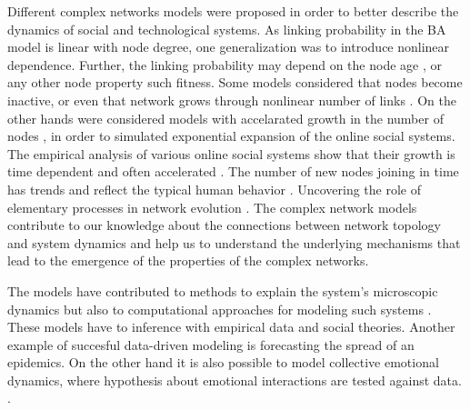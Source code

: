 Different complex networks models were proposed in order to better describe the dynamics of social and technological systems. As linking probability in the BA model is linear with node degree, one generalization was to introduce nonlinear dependence. Further, the linking probability may depend on the node age \cite{dorogovtsev2000b, dorogovtsev2001b}, or any other node property such fitness. Some models considered that nodes become inactive, or even that network grows through nonlinear number of links \cite{pham2016}. On the other hands were considered models with accelarated growth in the number of nodes \cite{sen2004}, in order to simulated exponential expansion of the online social systems. The empirical analysis of various online social systems show that their growth is time dependent and often accelerated \cite{liu2019}. The number of new nodes joining in time has trends and reflect the typical human behavior \cite{mitrovic2010a, mitrovic2012,mitrovic2015}. Uncovering the role of elementary processes in network evolution \cite{ghoshal2013uncovering}. The complex network models contribute to our knowledge about the connections between network topology and system dynamics and help us to understand the underlying mechanisms that lead to the emergence of the properties of the complex networks. %



The models have contributed to methods to explain the system's microscopic dynamics but also to computational approaches for modeling such systems \cite{schweitzer2018sociophysics}. These models have to inference with empirical data and social theories. Another example of succesful data-driven modeling is forecasting the spread of an epidemics. On the other hand it is also possible to model collective emotional dynamics, where hypothesis about emotional interactions are tested against data. \cite{garas2012emotional}. %










